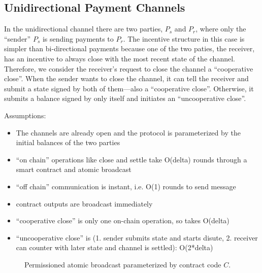 \subsection{Unidirectional Payment Channels}

In the unidirectional channel there are two parties, $P_s$ and $P_r$, where only the ``sender'' $P_s$ is sending payments to $P_r$.
The incentive structure in this case is simpler than bi-directional payments because one of the two paties, the receiver, has an incentive to always close with the most recent state of the channel.
Therefore, we consider the receiver's request to close the channel a ``cooperative close''. 
When the sender wants to close the channel, it can tell the receiver and submit a state signed by both of them---also a ``cooperative close''.
Otherwise, it submits a balance signed by only itself and initiates an ``uncooperative close''.

Assumptions:
\begin{itemize}
  \item The channels are already open and the protocol is parameterized by the initial balances of the two parties
  \item ``on chain'' operations like close and settle take O(delta) rounds through a smart contract and atomic broadcast
  \item ``off chain'' communication is instant, i.e. O(1) rounds to send message
  \item contract outputs are broadcast immediately
  \item ``cooperative close'' is only one on-chain operation, so takes O(delta)
  \item ``uncooperative close'' is (1. sender submits state and starts disute, 2. receiver can counter with later state and channel is settled): O(2*delta)
\end{itemize}


\begin{figure}[!htb]
	
	\caption{Permissioned atomic broadcast parameterized by contract code $C$.}
\end{figure}



